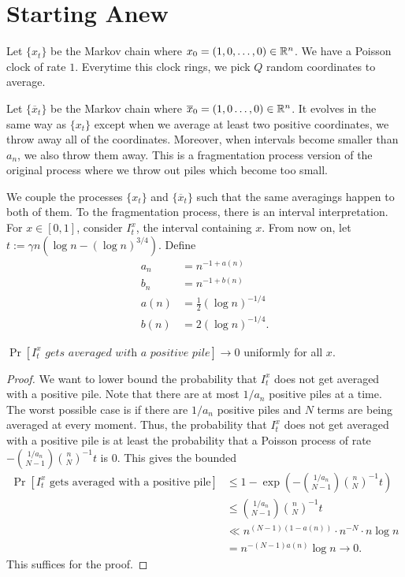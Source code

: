 \documentclass[12pt]{article}
\begin{document}
\section{Starting Anew}

\begin{defn}
	Let $\{x_t\}$ be the Markov chain where $x_0 = (1, 0, \ldots, 0) \in \mathbb{R}^n$. We have a Poisson clock of rate $1$. Everytime this clock rings, we pick $Q$ random coordinates to average. 
\end{defn}

\begin{defn}
	Let $\{\overline{x}_t\}$ be the Markov chain where $\overline{x}_0 = (1, 0 \ldots, 0) \in \mathbb{R}^n$. It evolves in the same way as $\{x_t\}$ except when we average at least two positive coordinates, we throw away all of the coordinates. Moreover, when intervals become smaller than $a_n$, we also throw them away. This is a fragmentation process version of the original process where we throw out piles which become too small. 
\end{defn}

We couple the processes $\{x_t\}$ and $\{\overline{x}_t\}$ such that the same averagings happen to both of them. To the fragmentation process, there is an interval interpretation. For $x \in [0, 1]$, consider $I_t^x$, the interval containing $x$. From now on, let $t := \gamma n ( \log n - (\log n)^{3/4})$. Define 
\begin{align*}
	a_n & = n^{-1 + a(n)} \\
	b_n & = n^{-1 + b(n)} \\
	a(n) & = \frac{1}{2} (\log n)^{-1/4} \\
	b(n) & = 2 (\log n)^{-1/4}.
\end{align*}

\begin{lem}
	$\Pr[I_t^x \textit{ gets averaged with a positive pile}] \to 0$ uniformly for all $x$. 
\end{lem}
\begin{proof}
	We want to lower bound the probability that $I_t^x$ does not get averaged with a positive pile. Note that there are at most $1/a_n$ positive piles at a time. The worst possible case is if there are $1/a_n$ positive piles and $N$ terms are being averaged at every moment. Thus, the probability that $I_t^x$ does not get averaged with a positive pile is at least the probability that a Poisson process of rate $- \binom{1/a_n}{N-1} \binom{n}{N}^{-1}t$ is $0$. This gives the bounded
	\begin{align*}
		\Pr[I_t^x \text{ gets averaged with a positive pile}] & \leq 1 - \exp \left ( - \binom{1/a_n}{N-1} \binom{n}{N}^{-1} t \right ) \\
		& \leq \binom{1/a_n}{N-1} \binom{n}{N}^{-1} t \\
		& \ll n^{(N-1)(1-a(n))} \cdot n^{-N} \cdot n \log n \\
		& = n^{-(N-1)a(n)} \log n \to 0. 
	\end{align*}
	This suffices for the proof. 
\end{proof}
\end{document}
